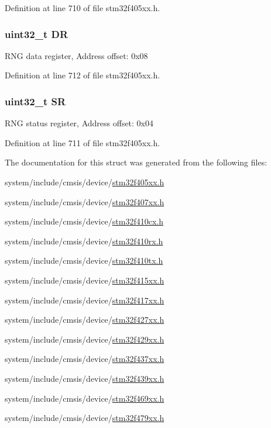 Definition at line 710 of file stm32f405xx.\+h.

\subsubsection[{\texorpdfstring{DR}{DR}}]{ uint32\+\_\+t DR}\hypertarget{struct_r_n_g___type_def_a3df0d8dfcd1ec958659ffe21eb64fa94}{}\label{struct_r_n_g___type_def_a3df0d8dfcd1ec958659ffe21eb64fa94}
R\+NG data register, Address offset\+: 0x08 

Definition at line 712 of file stm32f405xx.\+h.

\subsubsection[{\texorpdfstring{SR}{SR}}]{ uint32\+\_\+t SR}\hypertarget{struct_r_n_g___type_def_af6aca2bbd40c0fb6df7c3aebe224a360}{}\label{struct_r_n_g___type_def_af6aca2bbd40c0fb6df7c3aebe224a360}
R\+NG status register, Address offset\+: 0x04 

Definition at line 711 of file stm32f405xx.\+h.



The documentation for this struct was generated from the following files\+:\begin{DoxyCompactItemize}
\item 
system/include/cmsis/device/\hyperlink{stm32f405xx_8h}{stm32f405xx.\+h}\item 
system/include/cmsis/device/\hyperlink{stm32f407xx_8h}{stm32f407xx.\+h}\item 
system/include/cmsis/device/\hyperlink{stm32f410cx_8h}{stm32f410cx.\+h}\item 
system/include/cmsis/device/\hyperlink{stm32f410rx_8h}{stm32f410rx.\+h}\item 
system/include/cmsis/device/\hyperlink{stm32f410tx_8h}{stm32f410tx.\+h}\item 
system/include/cmsis/device/\hyperlink{stm32f415xx_8h}{stm32f415xx.\+h}\item 
system/include/cmsis/device/\hyperlink{stm32f417xx_8h}{stm32f417xx.\+h}\item 
system/include/cmsis/device/\hyperlink{stm32f427xx_8h}{stm32f427xx.\+h}\item 
system/include/cmsis/device/\hyperlink{stm32f429xx_8h}{stm32f429xx.\+h}\item 
system/include/cmsis/device/\hyperlink{stm32f437xx_8h}{stm32f437xx.\+h}\item 
system/include/cmsis/device/\hyperlink{stm32f439xx_8h}{stm32f439xx.\+h}\item 
system/include/cmsis/device/\hyperlink{stm32f469xx_8h}{stm32f469xx.\+h}\item 
system/include/cmsis/device/\hyperlink{stm32f479xx_8h}{stm32f479xx.\+h}\end{DoxyCompactItemize}
